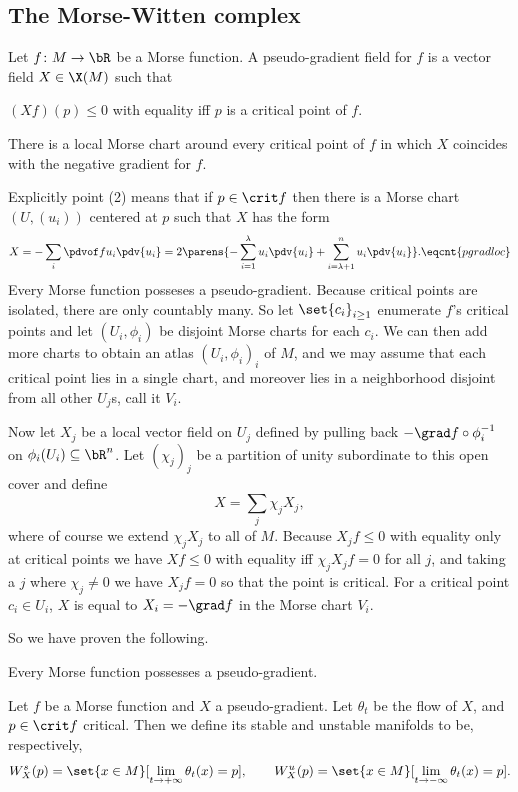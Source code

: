\subsection{The Morse-Witten complex}

\bdefn

    Let $f\colon M\to\bR$ be a Morse function.
    A {\emphcolor pseudo-gradient field} for $f$ is a vector field $X\in\X(M)$ such that
    \benum
        \item $(Xf)(p)\leq0$ with equality iff $p$ is a critical point of $f$.
        \item There is a local Morse chart around every critical point of $f$ in which $X$ coincides with
        the negative gradient for $f$.
    \eenum

\edefn

Explicitly point (2) means that if $p\in\crit f$ then there is a Morse chart $(U,(u_i))$ centered at $p$
such that $X$ has the form
$$ X = -\sum_i\pdvof f{u_i}\pdv{u_i} = 2\parens{-\sum_{i=1}^\lambda u_i\pdv{u_i} + \sum_{i=\lambda+1}^nu_i\pdv{u_i}} . \eqcnt{pgradloc} $$
Every Morse function posseses a pseudo-gradient.
Because critical points are isolated, there are only countably many.
So let $\set{c_i}_{i\geq1}$ enumerate $f$'s critical points and let $(U_i,\phi_i)$ be disjoint Morse charts
for each $c_i$.
We can then add more charts to obtain an atlas $(U_i,\phi_i)_i$ of $M$, and we may assume that each critical
point lies in a single chart, and moreover lies in a neighborhood disjoint from all other $U_j$s, call it
$V_i$.

Now let $X_j$ be a local vector field on $U_j$ defined by pulling back $-\grad f\circ\phi_i^{-1}$ on
$\phi_i(U_i)\subseteq\bR^n$.
Let $(\chi_j)_j$ be a partition of unity subordinate to this open cover and define
$$ X = \sum_j\chi_jX_j , $$
where of course we extend $\chi_jX_j$ to all of $M$.
Because $X_jf\leq0$ with equality only at critical points we have $Xf\leq0$ with equality iff $\chi_jX_jf=0$
for all $j$, and taking a $j$ where $\chi_j\neq0$ we have $X_jf=0$ so that the point is critical.
For a critical point $c_i\in U_i$, $X$ is equal to $X_i=-\grad f$ in the Morse chart $V_i$.

So we have proven the following.

\bprop

    Every Morse function possesses a pseudo-gradient.

\eprop

\bdefn

    Let $f$ be a Morse function and $X$ a pseudo-gradient.
    Let $\theta_t$ be the flow of $X$, and $p\in\crit f$ critical.
    Then we define its {\emphcolor stable} and {\emphcolor unstable manifolds} to be, respectively,
    $$ W^s_X(p) = \set{x\in M}[\lim_{t\to+\infty}\theta_t(x)=p],\qquad
    W^u_X(p) = \set{x\in M}[\lim_{t\to-\infty}\theta_t(x)=p] . $$

